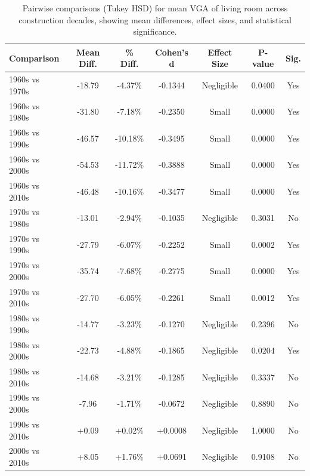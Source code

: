 \begin{table}[htbp]
    \centering
    \begin{tabular}{l|c|c|c|c|c|c}
    \hline
    \textbf{Comparison} & \textbf{Mean Diff.} & \textbf{\% Diff.} & \textbf{Cohen's d} & \textbf{Effect Size} & \textbf{P-value} & \textbf{Sig.} \\
    \hline
    1960s vs 1970s & -18.79 & -4.37\% & -0.1344 & Negligible & 0.0400 & Yes \\
    1960s vs 1980s & -31.80 & -7.18\% & -0.2350 & Small & 0.0000 & Yes \\
    1960s vs 1990s & -46.57 & -10.18\% & -0.3495 & Small & 0.0000 & Yes \\
    1960s vs 2000s & -54.53 & -11.72\% & -0.3888 & Small & 0.0000 & Yes \\
    1960s vs 2010s & -46.48 & -10.16\% & -0.3477 & Small & 0.0000 & Yes \\
    1970s vs 1980s & -13.01 & -2.94\% & -0.1035 & Negligible & 0.3031 & No \\
    1970s vs 1990s & -27.79 & -6.07\% & -0.2252 & Small & 0.0002 & Yes \\
    1970s vs 2000s & -35.74 & -7.68\% & -0.2775 & Small & 0.0000 & Yes \\
    1970s vs 2010s & -27.70 & -6.05\% & -0.2261 & Small & 0.0012 & Yes \\
    1980s vs 1990s & -14.77 & -3.23\% & -0.1270 & Negligible & 0.2396 & No \\
    1980s vs 2000s & -22.73 & -4.88\% & -0.1865 & Negligible & 0.0204 & Yes \\
    1980s vs 2010s & -14.68 & -3.21\% & -0.1285 & Negligible & 0.3337 & No \\
    1990s vs 2000s & -7.96 & -1.71\% & -0.0672 & Negligible & 0.8890 & No \\
    1990s vs 2010s & +0.09 & +0.02\% & +0.0008 & Negligible & 1.0000 & No \\
    2000s vs 2010s & +8.05 & +1.76\% & +0.0691 & Negligible & 0.9108 & No \\
    \hline
    \end{tabular}
    \caption{Pairwise comparisons (Tukey HSD) for mean VGA of living room across construction decades, showing mean differences, effect sizes, and statistical significance.}
    \label{tab:living_room_vga_tukey_hsd}
\end{table}

